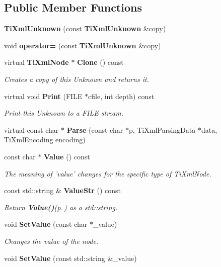 \subsection*{Public Member Functions}
\begin{CompactItemize}
\item 
{\bf Ti\-Xml\-Unknown} (const {\bf Ti\-Xml\-Unknown} \&copy)\label{classTiXmlUnknown_TiXmlUnknowna2}

\item 
void {\bf operator=} (const {\bf Ti\-Xml\-Unknown} \&copy)\label{classTiXmlUnknown_TiXmlUnknowna3}

\item 
virtual {\bf Ti\-Xml\-Node} $\ast$ {\bf Clone} () const\label{classTiXmlUnknown_TiXmlUnknowna4}

\begin{CompactList}\small\item\em Creates a copy of this Unknown and returns it. \item\end{CompactList}\item 
virtual void {\bf Print} (FILE $\ast$cfile, int depth) const\label{classTiXmlUnknown_TiXmlUnknowna5}

\begin{CompactList}\small\item\em Print this Unknown to a FILE stream. \item\end{CompactList}\item 
virtual const char $\ast$ {\bf Parse} (const char $\ast$p, Ti\-Xml\-Parsing\-Data $\ast$data, Ti\-Xml\-Encoding encoding)\label{classTiXmlUnknown_TiXmlUnknowna6}

\item 
const char $\ast$ {\bf Value} () const
\begin{CompactList}\small\item\em The meaning of 'value' changes for the specific type of Ti\-Xml\-Node. \item\end{CompactList}\item 
const std::string \& {\bf Value\-Str} () const
\begin{CompactList}\small\item\em Return {\bf Value()}{\rm (p.\,\pageref{classTiXmlNode_TiXmlUnknowna7})} as a std::string. \item\end{CompactList}\item 
void {\bf Set\-Value} (const char $\ast$\_\-value)
\begin{CompactList}\small\item\em Changes the value of the node. \item\end{CompactList}\item 
void {\bf Set\-Value} (const std::string \&\_\-value)\label{classTiXmlNode_TiXmlUnknowna10}


\end{CompactItemize}
